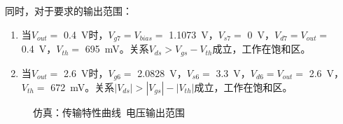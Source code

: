\documentclass[UTF8]{ctexart}
\numberwithin{figure}{subsection}
\numberwithin{table}{subsection}
\numberwithin{equation}{subsection}
\begin{document}
同时，对于要求的输出范围：
\begin{enumerate}
    \item 当\(V_{out} = \) \SI{0.4}{\volt}时，\(V_{g7} = V_{bias} = \) \SI[]{1.1073}{\volt}，\(V_{s7}  = \) \SI[]{0}{\volt}，\(V_{d7} = V_{out} =\) \SI[]{0.4}{\volt}，\(V_{th}  = \) \SI[]{695}{\milli\volt}。关系\(V_{ds} > V_{gs} - V_{th}\)成立，工作在饱和区。
    \item 当\(V_{out} = \) \SI{2.6}{\volt}时，\(V_{g6} = \) \SI[]{2.0828}{\volt}，\(V_{s6}  = \) \SI[]{3.3}{\volt}，\(V_{d6} = V_{out} =\) \SI[]{2.6}{\volt}，\(V_{th}  = \) \SI[]{672}{\milli\volt}。关系\(|V_{ds}| > |V_{gs}| - |V_{th}|\)成立，工作在饱和区。
\end{enumerate}

\begin{figure}[H]
    \centering
    \caption{仿真：传输特性曲线\ 电压输出范围}
    \label{transfer simulation}
\end{figure}
\end{document}
